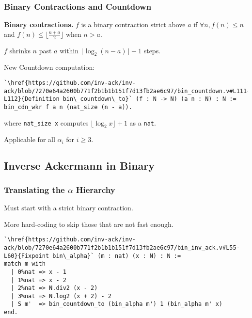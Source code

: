 \begin{frame}[fragile]
\frametitle{Binary Contractions and Countdown}

\textbf{Binary contractions.} $f$ is a binary contraction strict above $a$ if $\forall n, f(n)\le n$ and $f(n)\le \lfloor \frac{n+ a}{2} \rfloor$ when $n > a$.

\smallskip

$f$ shrinks $n$ past $a$ within $\lfloor\log_2(n - a) \rfloor + 1$ steps.

\bigskip

\pause 
New Countdown computation:
\begin{lstlisting}
`\href{https://github.com/inv-ack/inv-ack/blob/7270e64a2600b771f2b1b1b151f7d13fb2ae6c97/bin_countdown.v#L111-L112}{Definition bin\_countdown\_to}` (f : N -> N) (a n : N) : N :=
bin_cdn_wkr f a n (nat_size (n - a)).
\end{lstlisting}

where \texttt{nat\_size x} computes $\lfloor \log_2x \rfloor + 1$ as a \texttt{nat}.

\bigskip

\pause 
Applicable for all $\alpha_i$ for $i \ge 3$.
 
\end{frame}


\subsection{Inverse Ackermann in Binary}

\begin{frame}[fragile]
\frametitle{Translating the $\alpha$ Hierarchy}

Must start with a strict binary contraction.

\smallskip

More hard-coding to skip those that are not fast enough.

\bigskip

\pause 
\begin{lstlisting}
`\href{https://github.com/inv-ack/inv-ack/blob/7270e64a2600b771f2b1b1b151f7d13fb2ae6c97/bin_inv_ack.v#L55-L60}{Fixpoint bin\_alpha}` (m : nat) (x : N) : N :=
match m with
  | 0%nat => x - 1          
  | 1%nat => x - 2
  | 2%nat => N.div2 (x - 2) 
  | 3%nat => N.log2 (x + 2) - 2
  | S m'  => bin_countdown_to (bin_alpha m') 1 (bin_alpha m' x)
end.
\end{lstlisting}

\end{frame}


